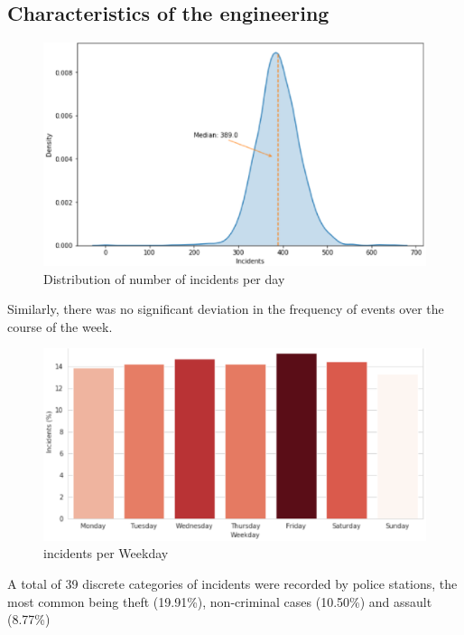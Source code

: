 \documentclass{amsart}
\begin{document}
\subsection{Characteristics of the engineering}
	\begin{center}
		\begin{figure}[htbp]
			\includegraphics[scale=0.7]{./pic/qmzhengtai.eps}
			\caption{Distribution of number of incidents per day}
		\end{figure}
	\end{center}
\hspace*{0.6cm}Similarly, there was no significant deviation in the frequency of events over the course of the week.
\begin{center}
	\begin{figure}[htbp]
		\includegraphics[scale=0.7]{./pic/qmzhifangtu.eps}
		\caption{incidents per Weekday}
	\end{figure}
\end{center}
\hspace*{0.6cm}A total of 39 discrete categories of incidents were recorded by police stations, the most common being theft (19.91\%), non-criminal cases (10.50\%) and assault (8.77\%)
\end{document}
